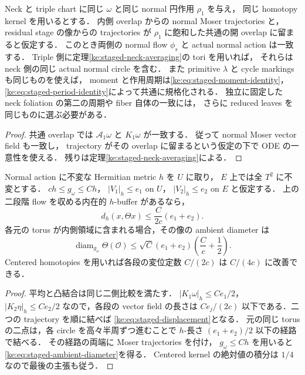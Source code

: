 \begin{corollary}
\label{ke:staged-normal-overlap}
Neck と triple chart に同じ $\omega$ と同じ normal 円作用 $\rho_1$ を与え，
同じ homotopy kernel を用いるとする．
内側 overlap からの normal Moser trajectories と，
residual stage の像からの trajectories が
$\rho_1$ に飽和した共通の開 overlap に留まると仮定する．
このとき両側の normal flow $\phi_s$ と actual normal action は一致する．
Triple 側に定理\ref{ke:staged-neck-averaging}の tori を用いれば，
それらは neck 側の同じ actual normal circle を含む．
また primitive $\lambda$ と cycle markings も同じものを使えば，
moment と作用周期は\eqref{ke:eq:staged-moment-identity}，
\eqref{ke:eq:staged-period-identity}によって共通に規格化される．
独立に固定した neck foliation の第二の周期や fiber 自体の一致には，
さらに reduced leaves を同じものに選ぶ必要がある．
\end{corollary}
\begin{proof}
共通 overlap では $\mathcal A_1\omega$ と $K_1\omega$ が一致する．
従って normal Moser vector field も一致し，
trajectory がその overlap に留まるという仮定の下で ODE の一意性を使える．
残りは定理\ref{ke:staged-neck-averaging}による．
\end{proof}

\begin{lemma}[短い作用に対する二段階構成の変位]
\label{ke:staged-displacement}
Normal action に不変な Hermitian metric $h$ を $U$ に取り，
$E$ 上では全 $T^2$ に不変とする．
$ch\le g_\omega\le Ch$，
$|V_1|_h\le e_1$ on $U$，
$|V_2|_h\le e_2$ on $E$ と仮定する．
上の二段階 flow を収める内在的 $h$-buffer があるなら，
\begin{equation}\label{ke:eq:staged-displacement}
 d_h(x,\Theta x)\le\frac{C}{2c}(e_1+e_2).
\end{equation}
各元の torus が内側領域に含まれる場合，その像の ambient diameter は
\begin{equation}\label{ke:eq:staged-ambient-diameter}
 \operatorname{diam}_{g_\omega}\Theta(\mathcal O)
 \le\sqrt C(e_1+e_2)\left(\frac Cc+\frac12\right).
\end{equation}
Centered homotopies を用いれば各段の変位定数 $C/(2c)$ は $C/(4c)$ に改善できる．
\end{lemma}
\begin{proof}
平均と凸結合は同じ二側比較を満たす．
$|K_1\omega|_h\le Ce_1/2$，
$|K_2\eta|_h\le Ce_2/2$ なので，各段の vector field の長さは
$Ce_j/(2c)$ 以下である．二つの trajectory を順に結べば
\eqref{ke:eq:staged-displacement}となる．
元の同じ torus の二点は，各 circle を高々半周ずつ進むことで
$h$-長さ $(e_1+e_2)/2$ 以下の経路で結べる．
その経路の両端に Moser trajectories を付け，
$g_\omega\le Ch$ を用いると\eqref{ke:eq:staged-ambient-diameter}を得る．
Centered kernel の絶対値の積分は $1/4$ なので最後の主張も従う．
\end{proof}

